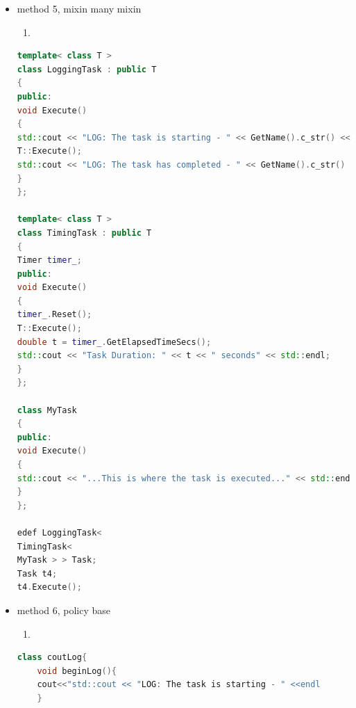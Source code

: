 \documentclass[a4paper,12pt,twoside]{book}
\begin{document}
\begin{itemize}
\begin{enumerate}
\end{enumerate}
\begin{lstlisting}[frame=single, language=c++]

class LoggingTask : public ITask
{
ITask* task_;
public:
LoggingTask( ITask* task ) : task_( task )
{
}

~LoggingTask()
{
delete task_;
}

virtual void Execute()
{
	std::cout << "LOG: The task is starting - " << GetName().c_str() << std::endl;
	if( task_ ) task_->Execute();
	std::cout << "LOG: The task has completed - " << GetName().c_str() << std::endl;
}
};



class MyTask : public ITask
{
public:
virtual void Execute()
{
std::cout << "...This is where the task is executed..." << std::endl;
}

virtual std::string GetName()
{
return "My task name";
}
};

ITask* t = new LoggingTask( 
new TimingTask( 
new MyTask() ) );
t->Execute();

\end{lstlisting}


	\item method 5, mixin many mixin
\begin{enumerate}
	\item 
\end{enumerate}
\begin{lstlisting}[frame=single, language=c++]
template< class T >
class LoggingTask : public T
{
public:
void Execute()
{
std::cout << "LOG: The task is starting - " << GetName().c_str() << std::endl;
T::Execute();
std::cout << "LOG: The task has completed - " << GetName().c_str() << std::endl;
}
};

template< class T >
class TimingTask : public T
{
Timer timer_;
public:
void Execute()
{
timer_.Reset();
T::Execute();
double t = timer_.GetElapsedTimeSecs();
std::cout << "Task Duration: " << t << " seconds" << std::endl;
}
};

class MyTask
{
public:
void Execute()
{
std::cout << "...This is where the task is executed..." << std::endl;
}
};

edef LoggingTask< 
TimingTask< 
MyTask > > Task;
Task t4;
t4.Execute();
\end{lstlisting}

	\item method 6, policy base
\begin{enumerate}
	\item 
\end{enumerate}
\begin{lstlisting}[frame=single, language=c++]
class coutLog{
	void beginLog(){
	cout<<"std::cout << "LOG: The task is starting - " <<endl
	}
	

\end{lstlisting}
\end{itemize}
\end{document}
